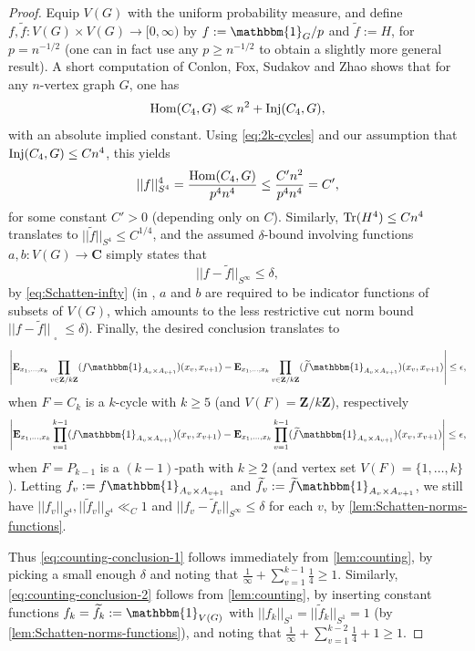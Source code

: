 \documentclass[reqno,11pt]{amsart}
\theoremstyle{definition}
\theoremstyle{remark}
\numberwithin{equation}{section}
\newcommand{\Z}{\mathbf{Z}}
\newcommand{\C}{\mathbf{C}}
\newcommand{\E}{\mathbf{E}}
\newcommand{\one}{\mathbbm{1}}
\renewcommand{\tilde}{\widetilde}
\newcommand{\sq}{_{\substack{ \\ \square}}}
\newcommand{\Tr}{\textnormal{Tr}}
\newcommand{\Hom}{\textnormal{Hom}}
\newcommand{\Inj}{\textnormal{Inj}}
\begin{document}
\begin{proof}
Equip $V(G)$ with the uniform probability measure, and define $f, \tilde{f} : V(G) \times V(G) \to [0, \infty)$ by $f := \one_{G}/p$ and $\tilde{f} := H$, for $p = n^{-1/2}$ (one can in fact use any $p \ge n^{-1/2}$ to obtain a slightly more general result). A short computation of Conlon, Fox, Sudakov and Zhao \cite[p.\ 2389, below $(11)$]{conlon2021regularity} shows that for any $n$-vertex graph $G$, one has
\begin{equation} \label{eq:4-cycle-counts}
    \Hom(C_4, G) 
    \ll n^2 + \Inj(C_4, G),
\end{equation}
with an absolute implied constant. Using \cref{eq:2k-cycles} and our assumption that $\Inj(C_4, G) \le Cn^4$, this yields
\[
    ||f||_{S^4}^4 = \frac{\Hom(C_4, G)}{p^4 n^4}
    \le \frac{C' n^2}{p^4 n^4} = C',
\]
for some constant $C' > 0$ (depending only on $C$). Similarly, $\Tr(H^4) \le Cn^4$ translates to $||\tilde{f}||_{S^4} \le C^{1/4}$, and the assumed $\delta$-bound involving functions $a, b : V(G) \to \C$ simply states that
\[
    ||f - \tilde{f}||_{S^\infty} \le \delta,
\]
by \cref{eq:Schatten-infty} (in \cite{conlon2021graphs}, $a$ and $b$ are required to be indicator functions of subsets of $V(G)$, which amounts to the less restrictive cut norm bound $||f - \tilde{f}||\sq \le \delta$). Finally, the desired conclusion translates to
\begin{equation} \label{eq:counting-conclusion-1}
    \left\vert 
    \E_{x_1, \ldots, x_k} \prod_{v \in \Z/k\Z} (f \one_{A_v \times A_{v+1}})(x_v,x_{v+1})
    -
    \E_{x_1, \ldots, x_k} \prod_{v \in \Z/k\Z} (\tilde{f} \one_{A_v \times A_{v+1}})(x_v,x_{v+1})
    \right\vert
    \le \epsilon,
\end{equation}
when $F = C_k$ is a $k$-cycle with $k \ge 5$ (and $V(F) = \Z/k\Z$), respectively
\begin{equation} \label{eq:counting-conclusion-2}
    \left\vert 
    \E_{x_1, \ldots, x_k} \prod_{v = 1}^{k-1} (f \one_{A_v \times A_{v+1}})(x_v,x_{v+1})
    -
    \E_{x_1, \ldots, x_k} \prod_{v = 1}^{k-1} (\tilde{f} \one_{A_v \times A_{v+1}})(x_v,x_{v+1})
    \right\vert
    \le \epsilon,
\end{equation}
when $F = P_{k-1}$ is a $(k-1)$-path with $k \ge 2$ (and vertex set $V(F) = \{1, \ldots, k\}$). Letting $f_v := f \one_{A_v \times A_{v+1}}$ and $\tilde{f}_v := \tilde{f} \one_{A_v \times A_{v+1}}$, we still have $||f_v||_{S^4}, ||\tilde{f}_v||_{S^4} \ll_C 1$ and $||f_v - \tilde{f}_v||_{S^\infty} \le \delta$ for each $v$, by \cref{lem:Schatten-norms-functions}. 

Thus \cref{eq:counting-conclusion-1} follows immediately from \cref{lem:counting}, by picking a small enough $\delta$ and noting that $\frac{1}{\infty} + \sum_{v=1}^{k-1} \frac{1}{4} \ge 1$. Similarly, \cref{eq:counting-conclusion-2} follows from \cref{lem:counting}, by inserting constant functions $f_k = \tilde{f}_k := \one_{V(G)}$ with $||f_k||_{S^1} = ||\tilde{f}_k||_{S^1} = 1$ (by \cref{lem:Schatten-norms-functions}), and noting that $\frac{1}{\infty} + \sum_{v=1}^{k-2} \frac{1}{4} + 1 \ge 1$. 
\end{proof}
\end{document}
